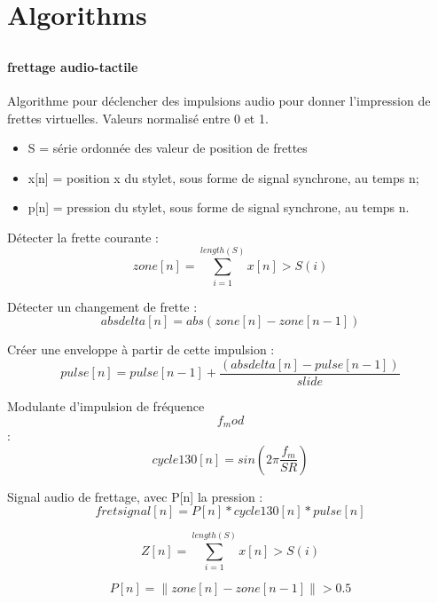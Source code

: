 \chapter{Algorithms}
\label{appendix:algorithms}

\section*{}
\subsection*{}
\subsubsection*{frettage audio-tactile}

Algorithme pour déclencher des impulsions audio pour donner l'impression de frettes virtuelles.
Valeurs normalisé entre 0 et 1.

\vspace{-1em}
\begin{itemize}[noitemsep]
\item  S = série ordonnée des valeur de position de frettes
\item  x[n] = position x du stylet, sous forme de signal synchrone, au temps n;
\item  p[n] = pression du stylet, sous forme de signal synchrone, au temps n.
\end{itemize}

Détecter la frette courante :
 $$zone[n] = \sum_{i=1}^{length(S)} x[n]>S(i) $$ 

Détecter un changement de frette :
 $$absdelta[n] = abs(zone[n] - zone[n-1]) $$ 

Créer une enveloppe à partir de cette impulsion :
 $$pulse[n] = pulse[n-1] + \frac{(absdelta[n] - pulse[n-1])}{slide} $$ 

Modulante d'impulsion de fréquence $$f_mod$$ :
$$cycle130[n] = sin(2\pi\frac{f_m}{SR})$$

Signal audio de frettage, avec P[n] la pression :
$$fretsignal[n] = P[n] * cycle130[n] * pulse[n]$$

\noindent
\begin{minipage}{.5\linewidth}
	\begin{equation}
   		Z[n] = \sum_{i=1}^{length(S)} x[n]>S(i)
	\end{equation}
\end{minipage}%
\begin{minipage}{.5\linewidth}
	\begin{equation}
  		P[n] = \lVert zone[n] - zone[n-1] \rVert > 0.5
	\end{equation}
\end{minipage}
